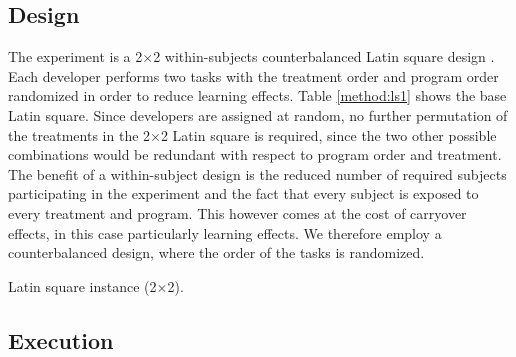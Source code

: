 \subsection{Design}
The experiment is a 2$\times$2 within-subjects counterbalanced Latin square design \cite{box}. Each developer performs two tasks with the treatment order and program order randomized in order to reduce learning effects. Table \ref{method:ls1} shows the base Latin square.
Since developers are assigned at random, no further permutation of the treatments in the 2$\times$2 Latin square is required, since the two other possible combinations would be redundant with respect to program order and treatment. The benefit of a within-subject design is the reduced number of required subjects participating in the experiment and the fact that every subject is exposed to every treatment and program. This however comes at the cost of carryover effects, in this case particularly learning effects. We therefore employ a counterbalanced design, where the order of the tasks is randomized.

\begin{table}[ht]
\centering
\caption{Latin square instance (2$\times$2).}
\label{method:ls1}
\end{table}

\subsection{Execution}

